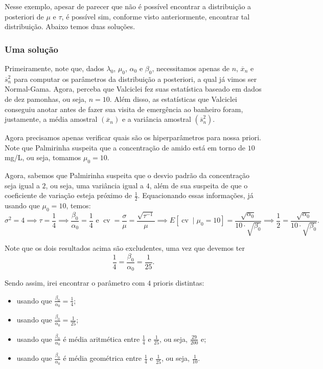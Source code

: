 \documentclass{article}
\begin{document}
Nesse exemplo, apesar de parecer que não é possível encontrar a distribuição a posteriori de $\mu$ e $\tau$, é possível sim, conforme visto anteriormente, encontrar tal distribuição. Abaixo temos duas soluções.

\subsubsection*{Uma solução}

Primeiramente, note que, dados $\lambda_0$, $\mu_0$, $\alpha_0$ e $\beta_0$, necessitamos apenas de $n$, $\overline{x}_n$ e $\overline{s}_n^2$ para computar os parâmetros da distribuição a posteriori, a qual já vimos ser Normal-Gama. Agora, perceba que Valciclei fez suas estatística baseado em dados de dez pamonhas, ou seja, $n = 10$. Além disso, as estatísticas que Valciclei conseguiu anotar antes de fazer sua visita de emergência ao banheiro foram, justamente, a média amostral $\left(\overline{x}_n\right)$ e a variância amostral $\left(\overline{s}_n^2\right)$.

Agora precisamos apenas verificar quais são os hiperparâmetros para nossa priori. Note que Palmirinha suspeita que a concentração de amido está em torno de $10$ mg/L, ou seja, tomamos $\mu_0 = 10$.

Agora, sabemos que Palmirinha suspeita que o desvio padrão da concentração seja igual a $2$, ou seja, uma variância igual a $4$, além de sua suspeita de que o coeficiente de variação esteja próximo de $\frac{1}{2}$. Equacionando essas informações, já usando que $\mu_0 = 10$, temos:
\[\sigma^2 = 4 \implies \tau = \dfrac{1}{4} \implies \dfrac{\beta_0}{\alpha_0} = \dfrac{1}{4} \text{ e } \operatorname{cv} = \dfrac{\sigma}{\mu} = \dfrac{\sqrt{\tau^{-1}}}{\mu} \implies E\left[\operatorname{cv} \mid \mu_0 = 10\right] = \dfrac{\sqrt{\alpha_0}}{10\cdot \sqrt{\beta_0}} \implies \dfrac{1}{2} = \dfrac{\sqrt{\alpha_0}}{10\cdot \sqrt{\beta_0}}.\]

Note que os dois resultados acima são excludentes, uma vez que devemos ter
\[\dfrac{1}{4} = \dfrac{\beta_0}{\alpha_0} = \dfrac{1}{25}.\]

Sendo assim, irei encontrar o parâmetro com $4$ prioris distintas:
\begin{itemize}
    \item
        usando que $\frac{\beta_0}{\alpha_0} = \frac{1}{4}$;
        
    \item
        usando que $\frac{\beta_0}{\alpha_0} = \frac{1}{25}$;
        
    \item
        usando que $\frac{\beta_0}{\alpha_0}$ é média aritmética entre $\frac{1}{4}$ e $\frac{1}{25}$, ou seja, $\frac{29}{200}$ e;
        
    \item
        usando que $\frac{\beta_0}{\alpha_0}$ é média geométrica entre $\frac{1}{4}$ e $\frac{1}{25}$, ou seja, $\frac{1}{10}$.
\end{itemize}
\end{document}
